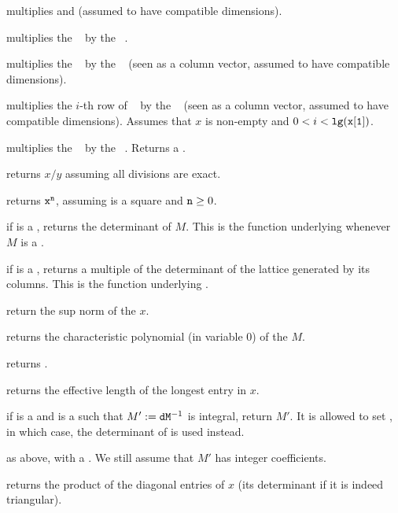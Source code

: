  multiplies  and  (assumed to
have compatible dimensions).

 multiplies the ~
by the ~.

 multiplies the ~
by the ~ (seen as a column vector, assumed to have compatible
dimensions).

 multiplies the $i$-th row
of ~ by the ~ (seen as a column vector, assumed
to have compatible dimensions). Assumes that $x$ is non-empty and
$0 < i < {\tt lg(x[1])}$.

 multiplies the ~
by the ~. Returns a .

 returns $x/y$ assuming all divisions
are exact.

 returns ${\tt x}^{\tt n}$, assuming 
is a square  and ${\tt n}\geq 0$.

 if  is a , returns the determinant of
$M$. This is the function underlying  whenever $M$ is a .

 if  is a , returns a multiple of
the determinant of the lattice generated by its columns. This is the function
underlying .

 return the sup norm of the  $x$.

 returns the characteristic polynomial (in
variable $0$) of the  $M$.

 returns .

 returns the effective length of the longest
entry in $x$.

 if  is a  and 
is a  such that $M' := {\tt d}{\tt M}^{-1}$ is integral,
return $M'$. It is allowed to set , in which case, the
determinant of  is used instead.

 as above, with  a . We
still assume that $M'$ has integer coefficients.

 returns the product of the diagonal
entries of $x$ (its determinant if it is indeed triangular).


